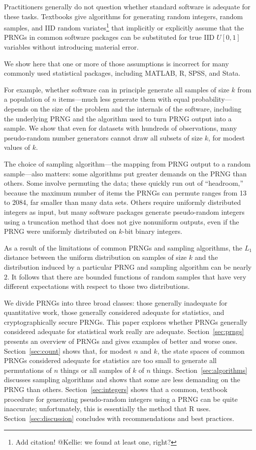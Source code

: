 \documentclass[graybox]{svmult}
\begin{document}
Practitioners generally do not question whether standard software is adequate for these tasks.
Textbooks give algorithms for generating random integers, random samples,
and IID random variates\footnote{%
Add citation! @Kellie: we found at least one, right?
} 
that implicitly or explicitly assume that the PRNGs in common software packages 
can be substituted for true IID $U[0,1]$ variables without introducing material error.

We show here that one or more of those assumptions is incorrect for many commonly used statistical packages,
including MATLAB, R, SPSS, and Stata.

For example, whether software can in principle generate all samples of size $k$ from a population of
$n$ items---much less generate them with equal probability---depends on the size of the problem and the internals of the software, including the underlying PRNG and the
algorithm used to turn PRNG output into a sample.
We show that even for datasets with hundreds of observations, 
many pseudo-random number generators
cannot draw all subsets of size $k$, for modest values of $k$.

The choice of sampling algorithm---the mapping from PRNG output to a random sample---also matters:
some algorithms put greater demands on the PRNG than others.
Some involve permuting the data; these quickly run out of ``headroom,'' because the maximum number of items the PRNGs can permute ranges from 13 to 2084, far smaller than many data sets.
Others require uniformly distributed integers as input, but many software packages generate
pseudo-random integers using a truncation method that does not give nonuniform outputs, even
if the PRNG were uniformly distributed on $k$-bit binary integers.

As a result of the limitations of common PRNGs and sampling algorithms,
the $L_1$ distance between the uniform distribution on samples of
size $k$ and the distribution induced by a particular PRNG and sampling algorithm can be nearly $2$.
It follows that there are bounded functions of random samples that have very different expectations with respect to those two distributions.

We divide PRNGs into three broad classes: those generally inadequate for quantitative work, those generally considered adequate for statistics, and cryptographically secure
PRNGs.
This paper explores whether PRNGs generally considered adequate for statistical work really are
adequate.
Section~\ref{sec:prngs} presents an overview of PRNGs and gives examples of better and worse ones.
Section~\ref{sec:count} shows that, for modest $n$ and $k$, the state spaces of common PRNGs considered adequate for statistics are too small to generate all permutations of $n$ things or all samples of $k$ of $n$ things. 
Section~\ref{sec:algorithms} discusses sampling algorithms and shows that some are less demanding on the PRNG than others. 
Section~\ref{sec:integers} shows that a common, textbook procedure for generating pseudo-random integers using a PRNG can be quite inaccurate; unfortunately, this is essentially the method that R uses.
Section~\ref{sec:discussion} concludes with recommendations and best practices.
\end{document}

